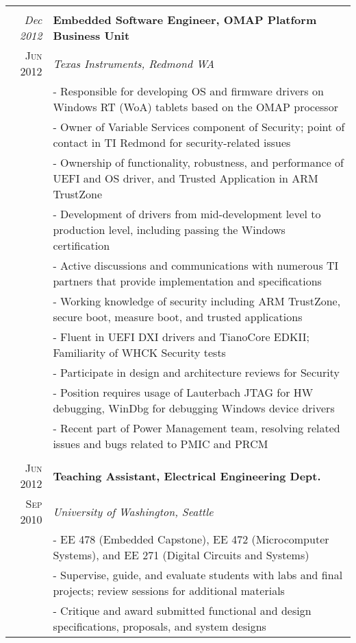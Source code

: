 \documentclass[letter,10pt]{article}
\begin{document}
\begin{tabular}{r|p{16cm}}
\multicolumn{2}{c}{} \\

\emph{Dec 2012} & \textbf{Embedded Software Engineer, OMAP Platform Business Unit}\\
\textsc{Jun 2012}&\emph{Texas Instruments, Redmond WA}\\
&\footnotesize{
 - Responsible for developing OS and firmware drivers on Windows RT (WoA) tablets based on the OMAP processor
}\\
&\footnotesize{
 - Owner of Variable Services component of Security; point of contact in TI Redmond for security-related issues
}\\
&\footnotesize{
 - Ownership of functionality, robustness, and performance of UEFI and OS driver, and Trusted Application in ARM TrustZone 
}\\
&\footnotesize{
 - Development of drivers from mid-development level to production level, including passing the Windows certification
}\\
&\footnotesize{
 - Active discussions and communications with numerous TI partners that provide implementation and specifications
}\\
&\footnotesize{
 - Working knowledge of security including ARM TrustZone, secure boot, measure boot, and trusted applications
}\\
&\footnotesize{
 - Fluent in UEFI DXI drivers and TianoCore EDKII; Familiarity of WHCK Security tests
}\\
&\footnotesize{
 - Participate in design and architecture reviews for Security
}\\
&\footnotesize{
 - Position requires usage of Lauterbach JTAG for HW debugging, WinDbg for debugging Windows device drivers
}\\
&\footnotesize{
 - Recent part of Power Management team, resolving related issues and bugs related to PMIC and PRCM
}\\

\multicolumn{2}{c}{} \\

\textsc{Jun 2012} & \textbf{Teaching Assistant, Electrical Engineering Dept.}\\
\textsc{Sep 2010}&\emph{University of Washington, Seattle}\\
&\footnotesize{
 - EE 478 (Embedded Capstone), EE 472 (Microcomputer Systems), and EE 271 (Digital Circuits and Systems)
}\\
&\footnotesize{
 - Supervise, guide, and evaluate students with labs and final projects; review sessions for additional materials
}\\
&\footnotesize{
 - Critique and award submitted functional and design specifications, proposals, and system designs
}\\


\end{tabular}
\end{document}
